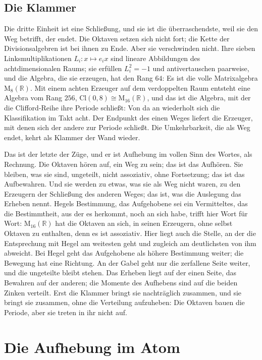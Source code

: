 \documentclass[11pt,a4paper]{article}
\newcommand{\Randlesart}{\marginpar{\raggedright\footnotesize\textcolor{lesart}{$\bigcirc$\,Lesart}}}
\newcommand{\R}{\mathbb R}
\newcommand{\Cl}{\mathrm{Cl}}
\newcommand{\M}{\mathrm M}
\begin{document}
\subsection{Die Klammer}

Die dritte Einheit ist eine Schließung, und sie ist die überraschendste, weil sie den Weg betrifft, der endet. Die Oktaven setzen sich nicht fort; die Kette der Divisionsalgebren ist bei ihnen zu Ende. Aber sie verschwinden nicht. Ihre sieben Linksmultiplikationen $L_i\colon x\mapsto e_ix$ sind lineare Abbildungen des achtdimensionalen Raums; sie erfüllen $L_i^2=-1$ und antivertauschen paarweise, und die Algebra, die sie erzeugen, hat den Rang $64$: Es ist die volle Matrixalgebra $\M_8(\R)$. Mit einem achten Erzeuger auf dem verdoppelten Raum entsteht eine Algebra vom Rang $256$, $\Cl(0,8)\cong\M_{16}(\R)$, und das ist die Algebra, mit der die Clifford-Reihe ihre Periode schließt: Von da an wiederholt sich die Klassifikation im Takt acht. Der Endpunkt des einen Weges liefert die Erzeuger, mit denen sich der andere zur Periode schließt. Die Umkehrbarkeit, die als Weg endet, kehrt als Klammer der Wand wieder.

\Randlesart Das ist der letzte der Züge, und er ist Aufhebung im vollen Sinn des Wortes, als Rechnung. Die Oktaven hören auf, ein Weg zu sein; das ist das Aufhören. Sie bleiben, was sie sind, ungeteilt, nicht assoziativ, ohne Fortsetzung; das ist das Aufbewahren. Und sie werden zu etwas, was sie als Weg nicht waren, zu den Erzeugern der Schließung des anderen Weges; das ist, was die Auslegung das Erheben nennt. Hegels Bestimmung, das Aufgehobene sei ein Vermitteltes, das die Bestimmtheit, aus der es herkommt, noch an sich habe, trifft hier Wort für Wort: $\M_{16}(\R)$ hat die Oktaven an sich, in seinen Erzeugern, ohne selbst Oktaven zu enthalten, denn es ist assoziativ. Hier liegt auch die Stelle, an der die Entsprechung mit Hegel am weitesten geht und zugleich am deutlichsten von ihm abweicht. Bei Hegel geht das Aufgehobene als höhere Bestimmung weiter; die Bewegung hat eine Richtung. An der Gabel geht nur die zerfallene Seite weiter, und die ungeteilte bleibt stehen. Das Erheben liegt auf der einen Seite, das Bewahren auf der anderen; die Momente des Aufhebens sind auf die beiden Zinken verteilt. Erst die Klammer bringt sie nachträglich zusammen, und sie bringt sie zusammen, ohne die Verteilung aufzuheben: Die Oktaven bauen die Periode, aber sie treten in ihr nicht auf.

\section{Die Aufhebung im Atom}
\label{sec:aufhebung}
\end{document}
